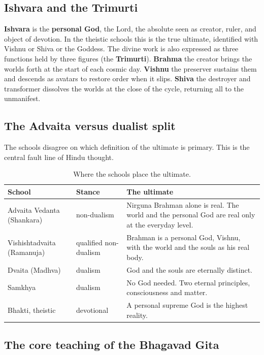 \subsection{Ishvara and the Trimurti}

\textbf{Ishvara} is the \textbf{personal God}, the Lord, the absolute seen as creator, ruler, and object of devotion. In the theistic schools this is the true ultimate, identified with Vishnu or Shiva or the Goddess. The divine work is also expressed as three functions held by three figures (the \textbf{Trimurti}). \textbf{Brahma} the creator brings the worlds forth at the start of each cosmic day. \textbf{Vishnu} the preserver sustains them and descends as avatars to restore order when it slips. \textbf{Shiva} the destroyer and transformer dissolves the worlds at the close of the cycle, returning all to the unmanifest.

\subsection{The Advaita versus dualist split}

The schools disagree on which definition of the ultimate is primary. This is the central fault line of Hindu thought.

\begin{longtable}{@{} L{0.24\textwidth}L{0.22\textwidth}L{0.42\textwidth}@{}}
\caption{Where the schools place the ultimate.}\\
\toprule
\textbf{School} & \textbf{Stance} & \textbf{The ultimate} \\
\midrule
Advaita Vedanta (Shankara) & non-dualism & Nirguna Brahman alone is real. The world and the personal God are real only at the everyday level. \\
Vishishtadvaita (Ramanuja) & qualified non-dualism & Brahman is a personal God, Vishnu, with the world and the souls as his real body. \\
Dvaita (Madhva) & dualism & God and the souls are eternally distinct. \\
Samkhya & dualism & No God needed. Two eternal principles, consciousness and matter. \\
Bhakti, theistic & devotional & A personal supreme God is the highest reality. \\
\bottomrule
\end{longtable}

\subsection{The core teaching of the Bhagavad Gita}

